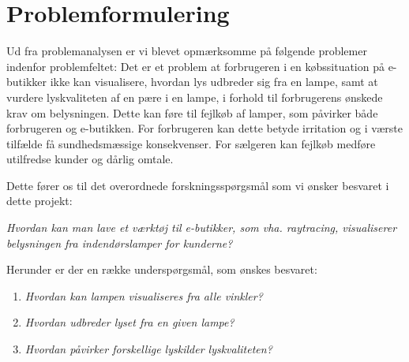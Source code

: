 \section{Problemformulering}

Ud fra problemanalysen er vi blevet opmærksomme på følgende problemer indenfor problemfeltet:
Det er et problem at forbrugeren i en købssituation på e-butikker ikke kan visualisere, hvordan lys udbreder sig fra en lampe, samt at vurdere lyskvaliteten af en pære i en lampe, i forhold til forbrugerens ønskede krav om belysningen. Dette kan føre til fejlkøb af lamper, som påvirker både forbrugeren og e-butikken. For forbrugeren kan dette betyde irritation og i værste tilfælde få sundhedsmæssige konsekvenser. For sælgeren kan fejlkøb medføre utilfredse kunder og dårlig omtale. 

Dette fører os til det overordnede forskningsspørgsmål som vi ønsker besvaret i dette projekt:

\textit{Hvordan kan man lave et værktøj til e-butikker, som vha. raytracing, visualiserer belysningen fra indendørslamper for kunderne?}

Herunder er der en række underspørgsmål, som ønskes besvaret:

\begin{enumerate}

\item \textit{Hvordan kan lampen visualiseres fra alle vinkler?}
\item \textit{Hvordan udbreder lyset fra en given lampe?}
\item \textit{Hvordan påvirker forskellige lyskilder lyskvaliteten?}

\end{enumerate}